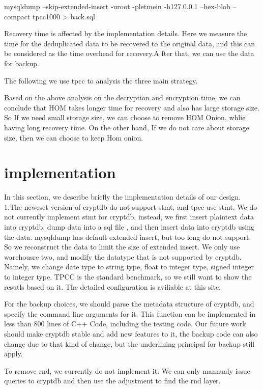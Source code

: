 mysqldump --skip-extended-insert -uroot -pletmein -h127.0.0.1 --hex-blob --compact tpcc1000 > back.sql



Recovery time is affected by the implementation details. Here we measure the time for the deduplicated data to be recovered to the original data, and this can be considered as the time overhead for recovery.A fter that, we can use the data for backup.


The following we use tpcc to analysis the three main strategy.


Based on the above analysis on the decryption and encryption time, we can conclude that HOM takes longer time for recovery and also has large storage size. So If we need small storage size, we can choose to remove HOM Onion, whlie having long recovery time. On the other hand, If we do not care about storage size, then we can choose to keep Hom onion. 






\section{implementation}

In this section, we describe briefly the implementation details of our design. 1.The neweset version of cryptdb do not support stmt, and tpcc-use stmt. We do not currently implement stmt for cryptdb, instead, we first insert plaintext data into cryptdb, dump data into a sql file , and then insert data into cryptdb using the data. mysqldump has default extended insert, but too long do not support. So we reconstruct the data to limit the size of extended insert. We only use warehousre two, and modify the datatype that is not supported by cryptdb. Namely, we change date type to string type, float to integer type, signed integer to integer type. TPCC is the standard benchmark, so we still want to show the resutls based on it. The detailed configuration is aviliable at this site.

For the backup choices, we should parse the metadata structure of cryptdb, and specify the command line arguments for it. This function can be implemented in less than 800 lines of C++ Code, including the testing code. Our future work should make cryptdb stable and add new features to it, the backup code can also change due to that kind of change, but the underlining principal for backup still apply.

To remove rnd, we currently do not implement it. We can only mannualy issue queries to cryptdb and then use the adjustment to find the rnd layer. 

